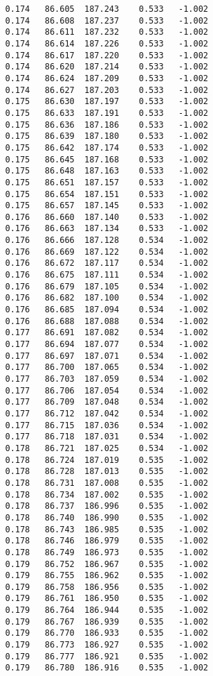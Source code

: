 \begin{verbatim}
   0.174   86.605  187.243    0.533   -1.002
   0.174   86.608  187.237    0.533   -1.002
   0.174   86.611  187.232    0.533   -1.002
   0.174   86.614  187.226    0.533   -1.002
   0.174   86.617  187.220    0.533   -1.002
   0.174   86.620  187.214    0.533   -1.002
   0.174   86.624  187.209    0.533   -1.002
   0.174   86.627  187.203    0.533   -1.002
   0.175   86.630  187.197    0.533   -1.002
   0.175   86.633  187.191    0.533   -1.002
   0.175   86.636  187.186    0.533   -1.002
   0.175   86.639  187.180    0.533   -1.002
   0.175   86.642  187.174    0.533   -1.002
   0.175   86.645  187.168    0.533   -1.002
   0.175   86.648  187.163    0.533   -1.002
   0.175   86.651  187.157    0.533   -1.002
   0.175   86.654  187.151    0.533   -1.002
   0.175   86.657  187.145    0.533   -1.002
   0.176   86.660  187.140    0.533   -1.002
   0.176   86.663  187.134    0.533   -1.002
   0.176   86.666  187.128    0.534   -1.002
   0.176   86.669  187.122    0.534   -1.002
   0.176   86.672  187.117    0.534   -1.002
   0.176   86.675  187.111    0.534   -1.002
   0.176   86.679  187.105    0.534   -1.002
   0.176   86.682  187.100    0.534   -1.002
   0.176   86.685  187.094    0.534   -1.002
   0.176   86.688  187.088    0.534   -1.002
   0.177   86.691  187.082    0.534   -1.002
   0.177   86.694  187.077    0.534   -1.002
   0.177   86.697  187.071    0.534   -1.002
   0.177   86.700  187.065    0.534   -1.002
   0.177   86.703  187.059    0.534   -1.002
   0.177   86.706  187.054    0.534   -1.002
   0.177   86.709  187.048    0.534   -1.002
   0.177   86.712  187.042    0.534   -1.002
   0.177   86.715  187.036    0.534   -1.002
   0.177   86.718  187.031    0.534   -1.002
   0.178   86.721  187.025    0.534   -1.002
   0.178   86.724  187.019    0.535   -1.002
   0.178   86.728  187.013    0.535   -1.002
   0.178   86.731  187.008    0.535   -1.002
   0.178   86.734  187.002    0.535   -1.002
   0.178   86.737  186.996    0.535   -1.002
   0.178   86.740  186.990    0.535   -1.002
   0.178   86.743  186.985    0.535   -1.002
   0.178   86.746  186.979    0.535   -1.002
   0.178   86.749  186.973    0.535   -1.002
   0.179   86.752  186.967    0.535   -1.002
   0.179   86.755  186.962    0.535   -1.002
   0.179   86.758  186.956    0.535   -1.002
   0.179   86.761  186.950    0.535   -1.002
   0.179   86.764  186.944    0.535   -1.002
   0.179   86.767  186.939    0.535   -1.002
   0.179   86.770  186.933    0.535   -1.002
   0.179   86.773  186.927    0.535   -1.002
   0.179   86.777  186.921    0.535   -1.002
   0.179   86.780  186.916    0.535   -1.002

\end{verbatim}

